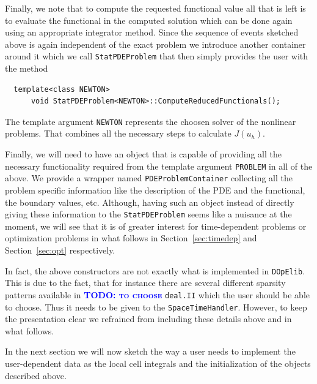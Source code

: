 \documentclass[prodmode,acmtoms]{acmsmall}
\numberwithin{equation}{section}
\newcommand{\deal}{\texttt{deal.II}}
\newcommand{\dope}{\texttt{DOpElib}}
\newcommand{\todo}[1]{\textbf{\textsc{\textcolor{blue}{TODO: #1}}}}
\begin{document}
Finally, we note that to compute the requested functional value 
all that is left is to evaluate the functional in the computed solution 
which can be done again using an appropriate integrator method.
Since the sequence of events sketched above is again independent of the 
exact problem we introduce another container around it which we call 
\texttt{StatPDEProblem} that then simply provides the user with the 
method
\begin{lstlisting}
  template<class NEWTON>
      void StatPDEProblem<NEWTON>::ComputeReducedFunctionals();
\end{lstlisting}
The template argument \texttt{NEWTON} represents the choosen solver of the nonlinear problems.
That combines all the necessary steps to calculate $J(u_h)$. 

Finally, we will need to have an object that is capable of providing all 
the necessary functionality required from the template argument 
\texttt{PROBLEM} in all of the above. We provide a wrapper named
\texttt{PDEProblemContainer} collecting all the problem specific information 
like the description of the PDE and the functional, the boundary values, etc. 
Although, having such an object instead of directly giving these information
to the \texttt{StatPDEProblem} seems like a nuisance at the moment, we will 
see that it is of greater interest for time-dependent problems or 
optimization problems in what follows in Section~\ref{sec:timedep} and
Section~\ref{sec:opt} respectively. 

\begin{remark}
In fact, the above constructors are not exactly what is implemented in \dope{}.
This is due to the fact, that for instance 
there are several different sparsity patterns available in 
\todo{to choose}
\deal{} which the user should be able to choose. Thus it needs to be 
given to the \texttt{SpaceTimeHandler}. However, to keep the 
presentation clear we refrained from including these details above and in
what follows.
\end{remark} 

In the next section we will now sketch the way a user needs to implement the
user-dependent data as the local cell integrals and the initialization of the
objects described above.
\end{document}
